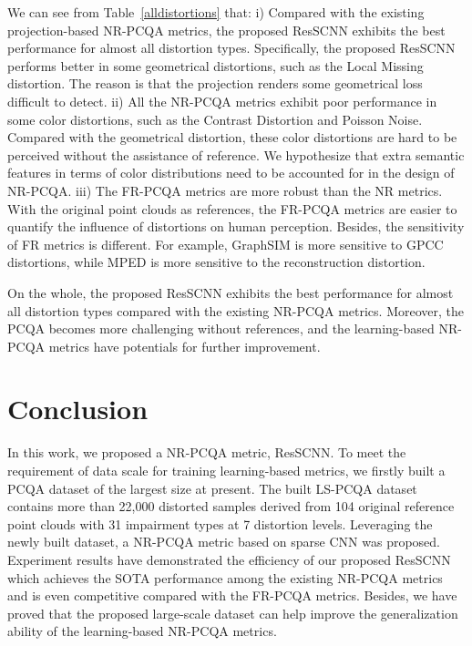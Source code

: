 \documentclass[acmsmall]{acmart}
\begin{document}
\par We can see from Table~\ref{alldistortions} that: i) Compared with the existing projection-based NR-PCQA metrics, the proposed ResSCNN exhibits the best performance for almost all distortion types. Specifically, the proposed ResSCNN performs better in some geometrical distortions, such as the Local Missing distortion. The reason is that the projection renders some geometrical loss difficult to detect. ii) All the NR-PCQA metrics exhibit poor performance in some color distortions, such as the Contrast Distortion and Poisson Noise. Compared with the geometrical distortion, these color distortions are hard to be perceived without the assistance of reference. We hypothesize that extra semantic features in terms of color distributions need to be accounted for in the design of NR-PCQA. iii) The FR-PCQA metrics are more robust than the NR metrics. With the original point clouds as references, the FR-PCQA metrics are easier to quantify the influence of distortions on human perception. Besides, the sensitivity of FR metrics is different. For example, GraphSIM is more sensitive to GPCC distortions, while MPED is more sensitive to the reconstruction distortion.


\par On the whole, the proposed ResSCNN exhibits the best performance for almost all distortion types compared with the existing NR-PCQA metrics. Moreover, the PCQA becomes more challenging without references, and the learning-based NR-PCQA metrics have potentials for further improvement.


\section{Conclusion}\label{sec:conclusion}

\par In this work, we proposed a NR-PCQA metric, ResSCNN. To meet the requirement of data scale for training learning-based metrics, we firstly built a PCQA dataset of the largest size at present. The built LS-PCQA dataset contains more than 22,000 distorted samples derived from 104 original reference point clouds with 31 impairment types at 7 distortion levels. Leveraging the newly built dataset, a NR-PCQA metric based on sparse CNN was proposed. Experiment results have demonstrated the efficiency of our proposed ResSCNN which achieves the SOTA performance among the existing NR-PCQA metrics and is even competitive compared with the FR-PCQA metrics. Besides, we have proved that the proposed large-scale dataset can help improve the generalization ability of the learning-based NR-PCQA metrics.
\end{document}
